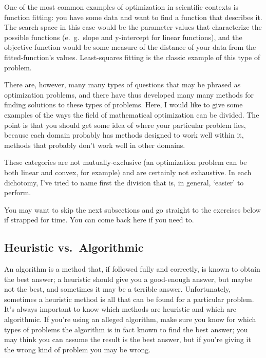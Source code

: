 \documentclass{article}
\begin{document}
	One of the most common examples of optimization in scientific contexts
	is function fitting: you have some data and want to find a function that
	describes it. The search space in this case would be the parameter values
	that characterize the possible functions 
	(e.\ g.\ slope and y-intercept for linear functions), 
	and the objective function
	would be some measure of the distance of your data from
	the fitted-function's values.
	Least-squares fitting is the classic example of this type of problem.

	There are, however, many many types of questions that may be phrased as
	optimization problems, and there have thus developed many many methods
	for finding solutions to these types of problems. Here, I would like to give
	some examples of the ways the field of mathematical optimization can
	be divided. The point is that you should get some idea of where your particular 
	problem lies, because each domain probably has methods designed to work well
	within it, methods that probably don't work well in other domains.
	
	These categories are not mutually-exclusive (an optimization
	problem can be both linear and convex, for example) and are certainly
	not exhaustive. In each dichotomy,
	I've tried to name first the division that is, in general, `easier' to perform.

	You may want to skip the next subsections and go straight to the
	exercises below if strapped for time. You can come back here if you need to.

  \subsection*{Heuristic vs.\ Algorithmic}
		An algorithm is a method that, if followed fully and correctly,
		is known to obtain the best answer; a heuristic should give you
		a good-enough answer, but maybe not the best, and sometimes it
		may be a terrible answer.
		Unfortunately, sometimes a heuristic method is all that can be
		found for a particular problem.
		It's always important to know which methods
		are heuristic and which are algorithmic. If you're using an alleged algorithm,
		make sure you know for which types of problems the algorithm is in fact
		known to find the best answer; you may think you can assume
		the result is the best answer, but if you're giving it the wrong kind
		of problem you may be wrong.
\end{document}
